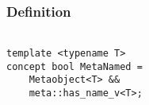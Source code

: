 
\subsubsection{Definition}

\begin{verbatim}

template <typename T>
concept bool MetaNamed =
	Metaobject<T> &&
	meta::has_name_v<T>;

\end{verbatim}
